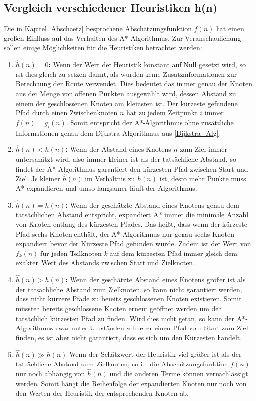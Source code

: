 		
		
	
	\subsection{Vergleich verschiedener Heuristiken h(n)}
		\label{Heuristik}
		Die in Kapitel \ref{Abschaetz} besprochene Abschätzungsfunktion $f(n)$ hat einen großen Einfluss auf das Verhalten des A*-Algorithmus.
		Zur Veranschaulichung sollen einige Möglichkeiten für die Heuristiken betrachtet werden\cite{Patel2016}:
		\begin{enumerate}
			\item \textbf{$\hat{h}(n)=0$:} Wenn der Wert der Heuristik konstant auf Null gesetzt wird, so ist dies gleich zu setzen damit, als würden keine Zusatzinformationen zur Berechnung der Route verwendet. Dies bedeutet das immer genau der Knoten aus der Menge von offenen Punkten ausgewählt wird, dessen Abstand zu einem der geschlossenen Knoten am kleinsten ist. Der kürzeste gefundene Pfad durch einen Zwischenknoten $n$ hat zu jedem Zeitpunkt $i$ immer $f(n)=g_i(n)$. Somit entspricht der A*-Algorithmus ohne zusätzliche Informationen genau dem Dijkstra-Algorithmus aus \ref{Dijkstra_Alg}.
			\item \textbf{$\hat{h}(n)<h(n)$:} Wenn der Abstand eines Knotens $n$ zum Ziel immer unterschätzt wird, also immer kleiner ist als der tatsächliche Abstand, so findet der A*-Algorithmus garantiert den kürzesten Pfad zwischen Start und Ziel. Je kleiner $\hat{h}(n)$ im Verhältnis zu $h(n)$ ist, desto mehr Punkte muss A* expandieren und umso langsamer läuft der Algorithmus.
			\item \textbf{$\hat{h}(n)=h(n)$:} Wenn der geschätzte Abstand eines Knotens genau dem tatsächlichen Abstand entspricht, expandiert A* immer die minimale Anzahl von Knoten entlang des kürzesten Pfades. Das heißt, dass wenn der kürzeste Pfad sechs Knoten enthält, der A*-Algorithmus nur genau sechs Knoten expandiert bevor der Kürzeste Pfad gefunden wurde. Zudem ist der Wert von $f_k(n)$ für jeden Teilknoten $k$ auf dem kürzesten Pfad immer gleich dem exakten Wert des Abstands zwischen Start und Zielknoten.
			\item \textbf{$\hat{h}(n)>h(n)$:} Wenn der geschätzte Abstand eines Knotens größer ist als der tatsächliche Abstand zum Zielknoten, so kann nicht garantiert werden, dass nicht kürzere Pfade zu bereits geschlossenen Knoten existieren.  Somit müssten bereits geschlossene Knoten erneut geöffnet werden um den tatsächlich kürzesten Pfad zu finden. Wird dies nicht getan, so kann der A*-Algorithmus zwar unter Umständen schneller einen Pfad vom Start zum Ziel finden, es ist aber nicht garantiert, dass es sich um den Kürzesten handelt.
			\item \textbf{$\hat{h}(n)\gg h(n)$} Wenn der Schätzwert der Heuristik viel größer ist als der tatsächliche Abstand zum Zielknoten, so ist die Abschätzungsfunktion $f(n)$ nur noch abhängig von $\hat{h}(n)$ und die anderen Terme können vernachlässigt werden. Somit hängt die Reihenfolge der expandierten Knoten nur noch von den Werten der Heuristik der entsprechenden Knoten ab.
		\end{enumerate}
		 
